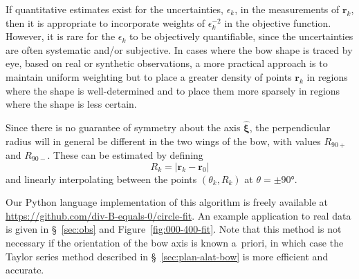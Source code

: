 \documentclass[useAMS, usenatbib, a4paper]{mnras}
\providecommand{\Abs}[1]{\left\lvert#1\right\rvert}
\newcommand\uvec[1]{\bm{\hat{#1}}}
\begin{document}
If quantitative estimates exist for the uncertainties, \(\epsilon_k\), in the
measurements of \(\bm{r}_k\), then it is appropriate to incorporate
weights of \(\epsilon_k^{-2}\) in the objective function.  However, it is
rare for the \(\epsilon_k\) to be objectively quantifiable, since the
uncertainties are often systematic and/or subjective.  In cases
where the bow shape is traced by eye, based on real or synthetic
observations, a more practical approach is to maintain uniform
weighting but to place a greater density of points \(\bm{r}_k\) in
regions where the shape is well-determined and to place them more
sparsely in regions where the shape is less certain.

Since there is no guarantee of symmetry about the axis \(\uvec{\xi}\),
the perpendicular radius will in general be different in the two wings
of the bow, with values \(R_{90+}\) and \(R_{90-}\).  These can be
estimated by defining
\begin{equation}
  \label{eq:rcurv-R-k}
  R_k = \Abs{\bm{r}_k - \bm{r}_0}
\end{equation}
and linearly interpolating between the points \((\theta_k, R_k)\) at
\(\theta = \pm \ang{90}\).

Our Python language implementation of this algorithm is freely
available at \url{https://github.com/div-B-equals-0/circle-fit}.  An
example application to real data is given in \S~\ref{sec:obs} and
Figure~\ref{fig:000-400-fit}.  Note that this method is not necessary
if the orientation of the bow axis is known a~priori, in which case
the Taylor series method described in \S~\ref{sec:plan-alat-bow} is
more efficient and accurate.

\bsp	%
\label{lastpage}
\end{document}
